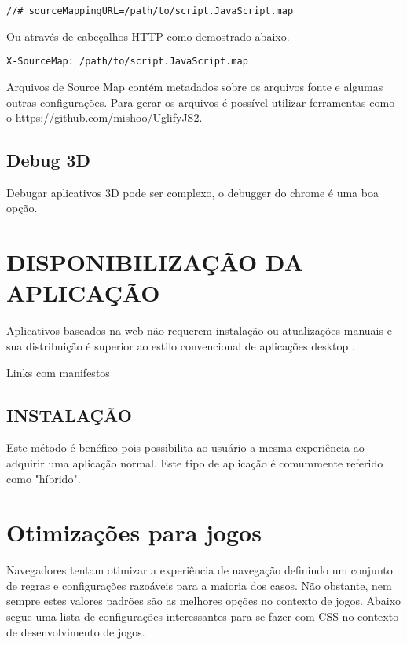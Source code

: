 \begin{verbatim}
//# sourceMappingURL=/path/to/script.JavaScript.map
\end{verbatim}

Ou através de cabeçalhos HTTP como demostrado abaixo.

\begin{verbatim}
X-SourceMap: /path/to/script.JavaScript.map
\end{verbatim}

Arquivos de Source Map contém metadados sobre os arquivos fonte e
algumas outras configurações.
Para gerar os arquivos é possível utilizar ferramentas como o
https://github.com/mishoo/UglifyJS2.

\begin{draft}
\subsection{Debug 3D}
Debugar aplicativos 3D pode ser complexo, o debugger do chrome é uma boa opção.

\end{draft}
\section{DISPONIBILIZAÇÃO DA APLICAÇÃO}
\begin{draft}
Aplicativos baseados na web não requerem instalação ou atualizações
manuais e sua distribuição é superior ao estilo convencional de
aplicações desktop \autocite{browserGamesTechnologyAndFuture}.

Links com manifestos

\subsection{INSTALAÇÃO}
Este método é benéfico pois possibilita ao usuário a mesma
experiência ao adquirir uma aplicação normal. Este tipo de
aplicação é comummente referido como "híbrido".

\end{draft}
\section{Otimizações para jogos}

Navegadores tentam otimizar a experiência de navegação definindo
um conjunto de regras e configurações razoáveis para a maioria dos
casos. Não obstante, nem sempre estes valores padrões são as melhores
opções no contexto de jogos. Abaixo segue uma lista de configurações
interessantes para se fazer com CSS no contexto de desenvolvimento de
jogos.

